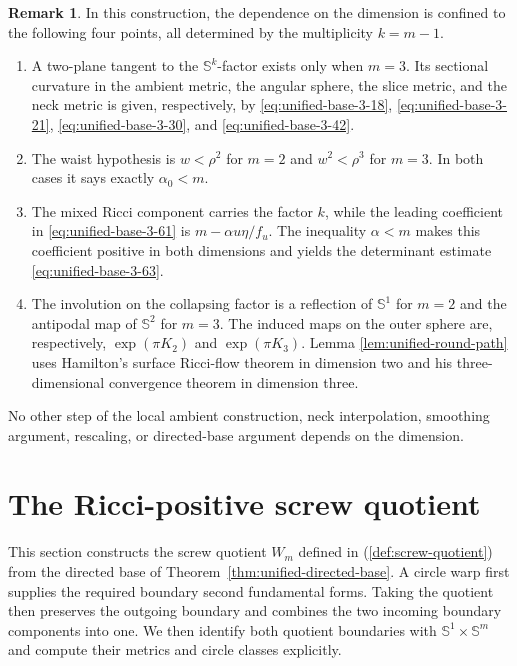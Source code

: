 \documentclass[11pt,reqno]{amsart}
\theoremstyle{definition}
\newtheorem{remark}[theorem]{Remark}
\numberwithin{equation}{section}
\begin{document}
\begin{remark}
\label{rem:unified-differences}
In this construction, the dependence on
the dimension is confined to the following four points, all determined
by the multiplicity $k=m-1$.
\begin{enumerate}[label=\textup{(\arabic*)}]
\item A two-plane tangent to the $\mathbb S^k$-factor exists only when
$m=3$.  Its sectional curvature in the ambient metric, the angular
sphere, the slice metric, and the neck metric is given, respectively,
by \eqref{eq:unified-base-3-18}, \eqref{eq:unified-base-3-21},
\eqref{eq:unified-base-3-30}, and \eqref{eq:unified-base-3-42}.
\item The waist hypothesis is $w<\rho^2$ for $m=2$ and
$w^2<\rho^3$ for $m=3$.  In both cases it says exactly
$\alpha_0<m$.
\item The mixed Ricci component carries the factor $k$, while the
leading coefficient in \eqref{eq:unified-base-3-61} is
$m-\alpha u\eta/f_u$.  The inequality $\alpha<m$ makes this coefficient
positive in both dimensions and yields the determinant estimate
\eqref{eq:unified-base-3-63}.
\item The involution on the collapsing factor is a reflection of
$\mathbb S^1$ for $m=2$ and the antipodal map of $\mathbb S^2$ for
$m=3$.  The induced maps on the outer sphere are, respectively,
$\exp(\pi K_2)$ and $\exp(\pi K_3)$.  Lemma
\ref{lem:unified-round-path} uses Hamilton's surface Ricci-flow theorem
\cite{Hamilton1988Surfaces} in dimension two and his
three-dimensional convergence theorem \cite{Hamilton1982} in dimension
three.
\end{enumerate}
No other step of the local ambient construction, neck interpolation,
smoothing argument, rescaling, or directed-base argument depends on the
dimension.
\end{remark}



\section{The Ricci-positive screw quotient}
\label{sec:unified-cable}

This section constructs the screw quotient $W_m$ defined in (\ref{def:screw-quotient}) from the directed base of
Theorem~\ref{thm:unified-directed-base}.  A circle warp first supplies
the required boundary second fundamental forms.  Taking the quotient
then preserves the outgoing boundary and combines the two incoming
boundary components into one.  We
then identify both quotient boundaries with
$\mathbb S^1\times\mathbb S^m$ and compute their metrics and circle
classes explicitly.
\end{document}
